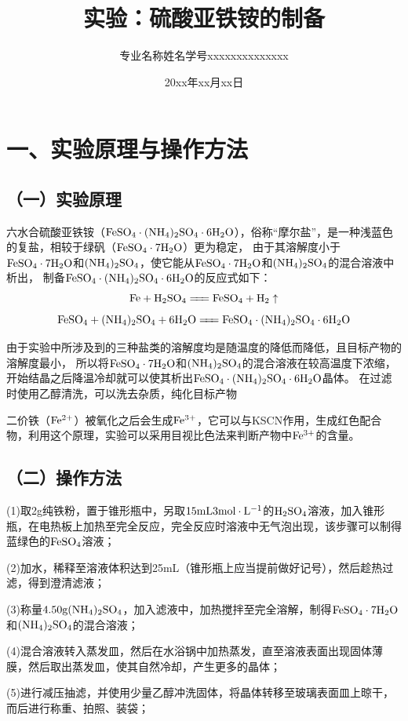 \documentclass[a4paper,12pt]{article}
\title{\heiti\zihao{2} 实验：硫酸亚铁铵的制备}
\author{专业名称\quad 姓\;名\quad 学号xxxxxxxxxxxxxx}
\date{20xx年xx月xx日}
\begin{document}
\maketitle

\setcounter{section}{0}
\section*{一、实验原理与操作方法}
\subsection*{（一）实验原理}
六水合硫酸亚铁铵（$\rm FeSO_4\cdot (NH_4)_2SO_4\cdot 6H_2O$），俗称“摩尔盐”，是一种浅蓝色的复盐，相较于绿矾（$\rm FeSO_4\cdot 7H_2O$）更为稳定，
由于其溶解度小于$\rm FeSO_4\cdot 7H_2O$和$\rm (NH_4)_2SO_4$，使它能从$\rm FeSO_4\cdot 7H_2O$和$\rm (NH_4)_2SO_4$的混合溶液中析出，
制备$\rm FeSO_4\cdot (NH_4)_2SO_4\cdot 6H_2O$的反应式如下：
$$
\rm Fe+H_2SO_4\xlongequal{\quad} FeSO_4+H_2\uparrow
$$$$
\rm FeSO_4+(NH_4)_2SO_4+6H_2O \xlongequal{\quad} FeSO_4\cdot (NH_4)_2SO_4\cdot 6H_2O
$$

由于实验中所涉及到的三种盐类的溶解度均是随温度的降低而降低，且目标产物的溶解度最小，
所以将$\rm FeSO_4\cdot 7H_2O$和$\rm (NH_4)_2SO_4$的混合溶液在较高温度下浓缩，开始结晶之后降温冷却就可以使其析出$\rm FeSO_4\cdot (NH_4)_2SO_4\cdot 6H_2O$晶体。
在过滤时使用乙醇清洗，可以洗去杂质，纯化目标产物

二价铁（$\rm Fe^{2+}$）被氧化之后会生成$\rm Fe^{3+}$，它可以与KSCN作用，生成红色配合物，利用这个原理，实验可以采用目视比色法来判断产物中$\rm Fe^{3+}$的含量。

\subsection*{（二）操作方法}

(1)取2g纯铁粉，置于锥形瓶中，另取$\rm 15mL 3mol\cdot L^{-1}$的$\rm H_2SO_4$溶液，加入锥形瓶，在电热板上加热至完全反应，完全反应时溶液中无气泡出现，该步骤可以制得蓝绿色的$\rm FeSO_4$溶液；

(2)加水，稀释至溶液体积达到25mL（锥形瓶上应当提前做好记号），然后趁热过滤，得到澄清滤液；

(3)称量$\rm 4.50g (NH_4)_2SO_4$，加入滤液中，加热搅拌至完全溶解，制得$\rm FeSO_4\cdot 7H_2O$和$\rm (NH_4)_2SO_4$的混合溶液；

(4)混合溶液转入蒸发皿，然后在水浴锅中加热蒸发，直至溶液表面出现固体薄膜，然后取出蒸发皿，使其自然冷却，产生更多的晶体；

(5)进行减压抽滤，并使用少量乙醇冲洗固体，将晶体转移至玻璃表面皿上晾干，而后进行称重、拍照、装袋；
\end{document}
